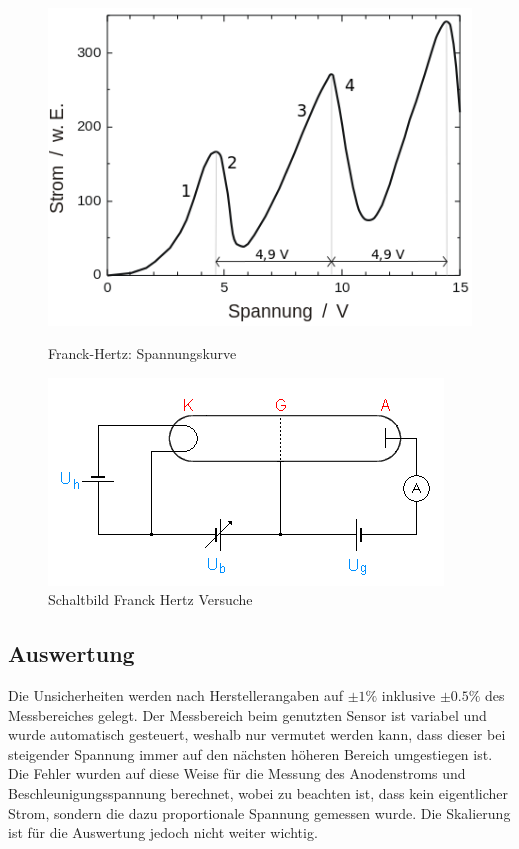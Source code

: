 \begin{figure}[htb]
    \centering
    \begin{minipage}{.45\linewidth}
        \centering
        \includegraphics[width=\linewidth]{../figs/Franck-Hertz_spannungskurve}
        \caption{Franck-Hertz: Spannungskurve \cite{wiki:franck-hertz}}
        \label{fig:franck-hertz-spannungskurve}
    \end{minipage}
    \hspace{.5cm}
    \begin{minipage}{.45\linewidth}
        \centering
        \includegraphics[width=\linewidth]{../figs/Schaltbild_Franck_Hertz_Versuch}
        \caption{Schaltbild Franck Hertz Versuche \cite{wiki:franck-hertz}}
        \label{fig:schaltbild_franck_hertz}
    \end{minipage}
\end{figure}

\subsection{Auswertung}
Die Unsicherheiten werden nach Herstellerangaben auf $\pm 1\%$ inklusive $\pm 0.5\%$ 
des Messbereiches gelegt. Der Messbereich beim genutzten Sensor ist variabel 
und wurde automatisch gesteuert, weshalb nur vermutet werden kann, dass dieser 
bei steigender Spannung immer auf den nächsten höheren Bereich umgestiegen ist. Die Fehler
wurden auf diese Weise für die Messung des Anodenstroms und Beschleunigungsspannung berechnet, wobei
zu beachten ist, dass kein eigentlicher Strom, sondern die dazu proportionale Spannung gemessen wurde.
Die Skalierung ist für die Auswertung jedoch nicht weiter wichtig. 

